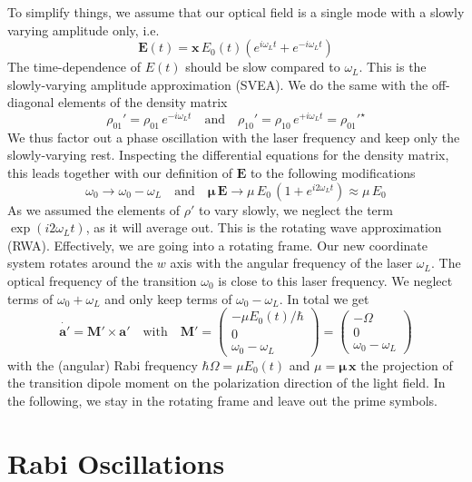 To simplify things, we assume that our optical field is a single mode with a slowly varying amplitude only, i.e.
\[
 \boldsymbol{E}(t) = \boldsymbol{x} \, E_0(t) \left( e^{i \omega_L t} + e^{-i \omega_L t} \right)
\]
The time-dependence of $E(t)$ should be slow compared to $\omega_L$. This is the slowly-varying amplitude approximation (SVEA). We do the same with the off-diagonal elements of the density matrix
\[
 \rho_{01}' = \rho_{01} \, e^{-i \omega_L t}  \quad \text{and} \quad
 \rho_{10}' = \rho_{10} \, e^{+i \omega_L t} = \rho_{01}'^\star
\]
We thus factor out a phase oscillation with the laser frequency and keep only the slowly-varying rest. Inspecting the differential equations for the density matrix, this leads together with our definition of $\boldsymbol{E}$ to the following modifications
\[
 \omega_0 \rightarrow \omega_0 - \omega_L \quad \text{and} \quad 
 \boldsymbol{\mu} \, \boldsymbol{E}  \rightarrow \mu \, E_0  \, ( 1+ e^{i 2\omega_L t} ) \approx \mu \, E_0 
\]
As we assumed the elements of $\rho'$ to vary slowly, we neglect the term $\exp(i 2 \omega_L t)$, as it will average out.  This is the rotating wave approximation (RWA). Effectively, we are going into a 
rotating frame. Our new coordinate system rotates around the $w$ axis with the angular frequency of the laser $\omega_L$. The optical frequency of the transition $\omega_0$ is close to this laser frequency. We neglect terms of $\omega_0 + \omega_L$ and only keep terms of  $\omega_0 - \omega_L$. In total we get
\[
 \dot{\boldsymbol{a}'} = \boldsymbol{M}'   \times \boldsymbol{a}' 
 \quad \text{with} \quad 
 \boldsymbol{M}'  = 
 \begin{pmatrix}
- \mu    E_0(t) / \hbar \\
0 \\
\omega_0 - \omega_L
 \end{pmatrix} = 
  \begin{pmatrix}
- \Omega \\
0 \\
\omega_0 - \omega_L
 \end{pmatrix}
\]
with the (angular) Rabi frequency $\hbar \Omega = \mu    E_0(t) $ and $\mu = \boldsymbol{\mu \, x}$ the projection of the transition dipole moment on the polarization direction of the light field. In the following, we stay in the rotating frame and leave out the prime symbols.


\section{Rabi Oscillations}

